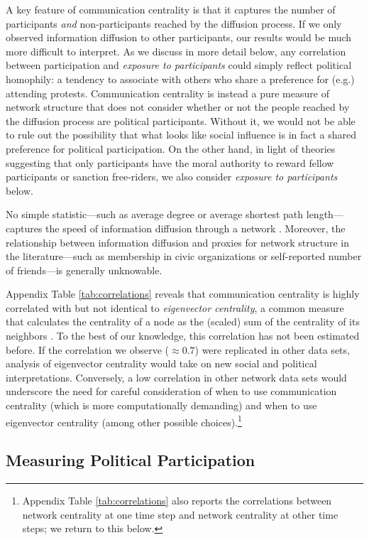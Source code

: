 \documentclass[12pt]{article}
\begin{document}
A key feature of communication centrality is that it captures the number of participants \emph{and} non-participants reached by the diffusion process. If we only observed information diffusion to other participants, our results would be much more difficult to interpret. As we discuss in more detail below, any correlation between participation and \emph{exposure to participants} could simply reflect political homophily: a tendency to associate with others who share a preference for (e.g.) attending protests. Communication centrality is instead a pure measure of network structure that does not consider whether or not the people reached by the diffusion process are political participants. Without it, we would not be able to rule out the possibility that what looks like social influence is in fact a shared preference for political participation. On the other hand, in light of theories suggesting that only participants have the moral authority to reward fellow participants or sanction free-riders, we also consider \emph{exposure to participants} below.

No simple statistic---such as average degree or average shortest path length---captures the speed of information diffusion through a network \citep{Newman:2006wv}. Moreover, the relationship between information diffusion and proxies for network structure in the literature---such as membership in civic organizations or self-reported number of friends---is generally unknowable.

Appendix Table \ref{tab:correlations} reveals that communication centrality is highly correlated with but not identical to \emph{eigenvector centrality}, a common measure that calculates the centrality of a node as the (scaled) sum of the centrality of its neighbors \citep[][41]{JacksonBook}. To the best of our knowledge, this correlation has not been estimated before. If the correlation we observe ($\approx0.7$) were replicated in other data sets, analysis of eigenvector centrality would take on new social and political interpretations. Conversely, a low correlation in other network data sets would underscore the need for careful consideration of when to use communication centrality (which is more computationally demanding) and when to use eigenvector centrality (among other possible choices).\footnote{Appendix Table \ref{tab:correlations} also reports the correlations between network centrality at one time step and network centrality at other time steps; we return to this below.}


\subsection{Measuring Political Participation}\label{sec:measureprotest}
\end{document}
